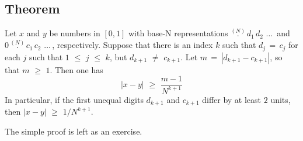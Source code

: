 \V

            \subsection{\small{\bf Theorem}}
            \label{ThmB30.65C}

\V


         Let $x$ and $y$ be numbers in $[0,1]$ with base-N representations $\stackrel{(N)}{.}\,d_{1}\,d_{2}\,\,{\ldots}\,$ and
    $0\,\stackrel{(N)}{.}\,c_{1}\,c_{2}\,\,{\ldots}\,$, respectively.
    Suppose that there is an index $k$ such that $d_{j} \,=\, c_{j}$ for each $j$ such that $1\,\,{\leq}\,\,j\,\,{\leq}\,\,k$,
    but $d_{k+1} \,\,{\neq}\,\, c_{k+1}$. Let $m \,=\, |d_{k+1}-c_{k+1}|$, so that $m\,\,{\geq}\,\,1$.
    Then one has
        \begin{displaymath}
        |x-y|\,\,{\geq}\,\,\frac{m-1}{N^{k+1}}
        \end{displaymath}
    In particular, if the first unequal digits $d_{k+1}$ and $c_{k+1}$ differ by at least $2$ units, then $|x-y|\,\,{\geq}\,\,1/N^{k+1}$.

\V

        The simple proof is left as an exercise.

\VV


